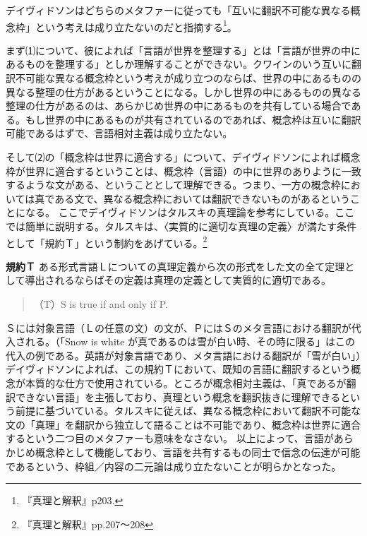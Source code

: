 \documentclass[b5j,twoside,twocolumn]{utarticle}
\begin{document}
デイヴィドソンはどちらのメタファーに従っても「互いに翻訳不可能な異なる概念枠」という考えは成り立たないのだと指摘する\footnote{『真理と解釈』p203.}。


まず⑴について、彼によれば「言語が世界を整理する」とは「言語が世界の中にあるものを整理する」としか理解することができない。クワインのいう互いに翻訳不可能な異なる概念枠という考えが成り立つのならば、世界の中にあるものの異なる整理の仕方があるということになる。しかし世界の中にあるものの異なる整理の仕方があるのは、あらかじめ世界の中にあるものを共有している場合である。もし世界の中にあるものが共有されているのであれば、概念枠は互いに翻訳可能であるはずで、言語相対主義は成り立たない。


そして⑵の「概念枠は世界に適合する」について、デイヴィドソンによれば概念枠が世界に適合するということは、概念枠（言語）の中に世界のありように一致するような文がある、ということとして理解できる。つまり、一方の概念枠においては真である文で、異なる概念枠においては翻訳できないものがあるということになる。
ここでデイヴィドソンはタルスキの真理論を参考にしている。ここでは簡単に説明する。タルスキは、〈実質的に適切な真理の定義〉が満たす条件として「規約Ｔ」という制約をあげている。\footnote{『真理と解釈』pp.207〜208}
\begin{itembox}[l]{\textbf{規約Ｔ}}
ある形式言語Ｌについての真理定義から次の形式をした文の全て定理として導出されるならばその定義は真理の定義として実質的に適切である。
\begin{quote}
（T）S is true if and only if P.
\end{quote}
\end{itembox}


Ｓには対象言語（Ｌの任意の文）の文が、ＰにはＳのメタ言語における翻訳が代入される。（「Snow is white が真であるのは雪が白い時、その時に限る」はこの代入の例である。英語が対象言語であり、メタ言語における翻訳が「雪が白い」）デイヴィドソンによれば、この規約Ｔにおいて、既知の言語に翻訳するという概念が本質的な仕方で使用されている。ところが概念相対主義は、「真であるが翻訳できない言語」を主張しており、真理という概念を翻訳抜きに理解できるという前提に基づいている。タルスキに従えば、異なる概念枠において翻訳不可能な文の「真理」を翻訳から独立して語ることは不可能であり、概念枠は世界に適合するという二つ目のメタファーも意味をなさない。
以上によって、言語があらかじめ概念枠として機能しており、言語を共有するもの同士で信念の伝達が可能であるという、枠組／内容の二元論は成り立たないことが明らかとなった。
\end{document}
